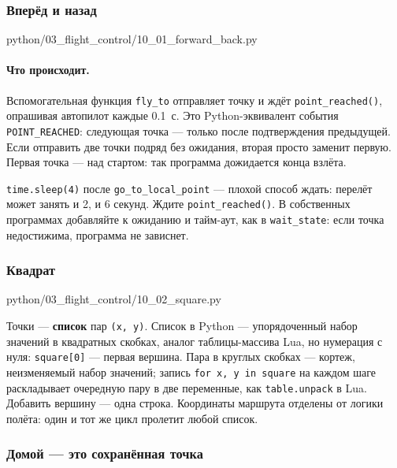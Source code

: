 \subsubsection*{Вперёд и назад}

\begin{codefile}[python]{python/03_flight_control/10_01_forward_back.py}
\end{codefile}

\paragraph{Что происходит.} Вспомогательная функция \verb|fly_to| отправляет точку и ждёт \verb|point_reached()|, опрашивая автопилот каждые 0.1~с. Это Python-эквивалент события \verb|POINT_REACHED|: следующая точка --- только после подтверждения предыдущей. Если отправить две точки подряд без ожидания, вторая просто заменит первую. Первая точка --- над стартом: так программа дожидается конца взлёта.

\begin{rulebox}
\verb|time.sleep(4)| после \verb|go_to_local_point| --- плохой способ ждать: перелёт может занять и 2, и 6 секунд. Ждите \verb|point_reached()|. В собственных программах добавляйте к ожиданию и тайм-аут, как в \verb|wait_state|: если точка недостижима, программа не зависнет.
\end{rulebox}

\subsubsection*{Квадрат}

\begin{codefile}[python]{python/03_flight_control/10_02_square.py}
\end{codefile}

Точки --- \textbf{список} пар \verb|(x, y)|. Список в Python --- упорядоченный набор значений в квадратных скобках, аналог таблицы-массива Lua, но нумерация с нуля: \verb|square[0]| --- первая вершина. Пара в круглых скобках --- кортеж, неизменяемый набор значений; запись \verb|for x, y in square| на каждом шаге раскладывает очередную пару в две переменные, как \verb|table.unpack| в Lua. Добавить вершину --- одна строка. Координаты маршрута отделены от логики полёта: один и тот же цикл пролетит любой список.

\subsubsection*{Домой --- это сохранённая точка}

